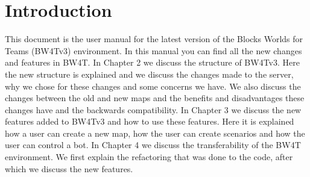 \chapter{Introduction}
This document is the user manual for the latest version of the Blocks Worlds for Teams (BW4Tv3) environment. In this manual you can find all the new changes and features in BW4T. In Chapter 2 we discuss the structure of BW4Tv3. Here the new structure is explained and we discuss the changes made to the server, why we chose for these changes and some concerns we have. We also discuss the changes between the old and new maps and the benefits and disadvantages these changes have and the backwards compatibility. In Chapter 3 we discuss the new features added to BW4Tv3 and how to use these features. Here it is explained how a user can create a new map, how the user can create scenarios and how the user can control a bot. In Chapter 4 we discuss the transferability of the BW4T environment. We first explain the refactoring that was done to the code, after which we discuss the new features.